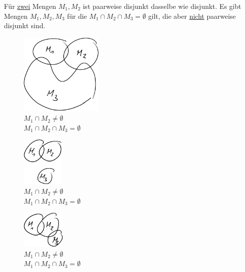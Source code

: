\Bem Für \ul{zwei} Mengen $M_1,M_2$ ist {\flqq paarweise disjunkt\frqq} dasselbe wie {\flqq disjunkt\frqq}.
\Beachte Es gibt Mengen $M_1,M_2,M_3$ für die $M_1\cap M_2\cap M_3 = \emptyset$ gilt, die aber \ul{nicht} paarweise disjunkt sind.
\begin{figure}[h!]
	\begin{minipage}{0.32\linewidth}
		\centering \includegraphics[width=4cm]{Bilder/178}\\
		$M_1\cap M_2\ne\emptyset$\\
		$M_1\cap M_2\cap M_3=\emptyset$
		\caption{}
	\end{minipage}
	\begin{minipage}{0.32\linewidth}
		\centering \includegraphics[width=2cm]{Bilder/179}\\
		$M_1\cap M_2\ne\emptyset$\\
		$M_1\cap M_2\cap M_3=\emptyset$
		\caption{}
	\end{minipage}
	\begin{minipage}{0.32\linewidth}
		\centering \includegraphics[width=2.1cm]{Bilder/180}\\
		$M_1\cap M_2\ne\emptyset$\\
		$M_1\cap M_2\cap M_3=\emptyset$
		\caption{}
	\end{minipage}
\end{figure}


